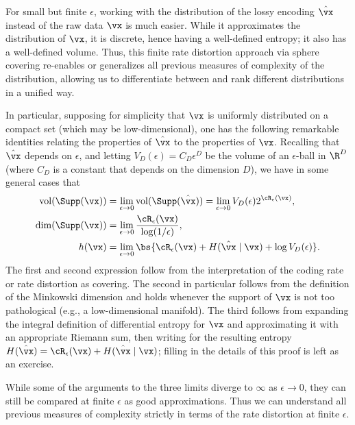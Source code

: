 \documentclass[../../book-main.tex]{subfiles}
\begin{document}
\begin{remark}
	For small but finite \(\epsilon\), working with the distribution of the lossy encoding \(\hat \vx\) instead of the raw data \(\vx\) is much easier. While it approximates the distribution of \(\vx\), it is discrete, hence having a well-defined entropy; it also has a well-defined volume. Thus, this finite rate distortion approach via sphere covering re-enables or generalizes all previous measures of complexity of the distribution, allowing us to differentiate between and rank different distributions in a unified way.

	In particular, supposing for simplicity that \(\vx\) is uniformly distributed on a compact set (which may be low-dimensional), one has the following remarkable identities relating the properties of \(\hat{\vx}\) to the properties of \(\vx\). Recalling that \(\hat{\vx}\) depends on \(\epsilon\), and letting \(V_{D}(\epsilon) = C_{D}\epsilon^{D}\) be the volume of an \(\epsilon\)-ball in \(\R^{D}\) (where \(C_{D}\) is a constant that depends on the dimension \(D\)), we have in some general cases that
	\begin{align}
		\operatorname{vol}(\Supp(\vx))
		&= \lim_{\epsilon \to 0}\operatorname{vol}(\Supp(\hat \vx)) = \lim_{\epsilon \to 0}V_{D}(\epsilon)2^{\cR_{\epsilon}(\vx)}, \\
		\dim(\Supp(\vx))
		&= \lim_{\epsilon \to 0}\frac{\cR_{\epsilon}(\vx)}{\log(1/\epsilon)}, \\
		h(\vx)
		&= \lim_{\epsilon \to 0}\bs{\cR_{\epsilon}(\vx) + H(\hat{\vx} \mid \vx) + \log V_{D}(\epsilon)}.
	\end{align}
	The first and second expression follow from the interpretation of the coding rate or rate distortion as covering. The second in particular follows from the definition of the Minkowski dimension \citep{bishop2017fractals} and holds whenever the support of \(\vx\) is not too pathological (e.g., a low-dimensional manifold). The third follows from expanding the integral definition of differential entropy for \(\vx\) and approximating it with an appropriate Riemann sum, then writing for the resulting entropy \(H(\hat{\vx}) = \cR_{\epsilon}(\vx) + H(\hat{\vx} \mid \vx)\); filling in the details of this proof is left as an exercise.

	While some of the arguments to the three limits diverge to \(\infty\) as \(\epsilon \to 0\), they can still be compared at finite \(\epsilon\) as good approximations. Thus we can understand all previous measures of complexity strictly in terms of the rate distortion at finite \(\epsilon\).
\end{remark}
\end{document}

